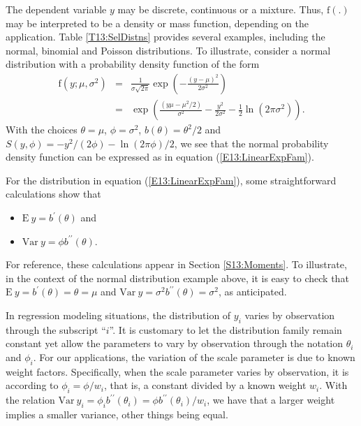 The dependent variable $y$ may be discrete, continuous or a mixture.
Thus, $\mathrm{f} \left( .\right) $ may be interpreted to be a
density or mass function, depending on the application. Table
\ref{T13:SelDistns} provides several examples, including the normal,
binomial and Poisson distributions. To illustrate, consider a
normal distribution with a probability density function of the form%
\begin{eqnarray*}
\mathrm{f}( y; \mu ,\sigma ^{2})  &=&\frac{1}{\sigma \sqrt{2\pi
}}\exp \left( -
\frac{(y-\mu )^{2}}{2\sigma ^{2}}\right)  \\
&=&\exp \left( \frac{(y\mu -\mu ^{2}/2)}{\sigma ^{2}}-\frac{y^{2}}{2\sigma
^{2}}-\frac{1}{2}\ln \left( 2\pi \sigma ^{2}\right) \right) .
\end{eqnarray*}
With the choices $\theta =\mu $, $\phi =\sigma ^{2}$, $b(\theta
)=\theta ^{2}/2$ and $S\left( y,\phi \right) =-y^{2}/(2\phi )-\ln
\left( 2\pi \phi \right) /2$, we see that the normal probability
density function can be expressed as in equation
(\ref{E13:LinearExpFam}).

For the distribution in equation (\ref{E13:LinearExpFam}), some
straightforward calculations show that
\begin{itemize}
\item $\mathrm{E~}y=b^{\prime }(\theta )$ and
\item $\mathrm{Var~}y=\phi b^{\prime \prime }(\theta )$.
\end{itemize}
For reference, these calculations appear in Section
\ref{S13:Moments}. To illustrate, in the context of the normal
distribution example above, it is easy to check that
$\mathrm{E~}y=b^{\prime }(\theta )=\theta =\mu $ and $\mathrm{Var~}
y = \sigma ^{2}b^{\prime \prime }(\theta )=\sigma ^{2}$, as
anticipated.

In regression modeling situations, the distribution of $y_i$ varies
by observation through the subscript ``$i$''.  It is customary to let the
distribution family remain constant yet allow
the parameters to vary by observation through the notation
$\theta_i$ and $\phi_i$. For our applications, the variation of the
scale parameter is due to known weight factors. Specifically, when
the scale parameter varies by observation, it is according to $\phi
_i=\phi /w_i$, that is, a constant divided by a known weight $w_i$.
With the relation $\mathrm{Var~}y_i=\phi_i b^{\prime \prime
}(\theta_i)=\phi b^{\prime \prime }(\theta_i)/w_i$, we have that a
larger weight implies a smaller variance, other things being equal.

